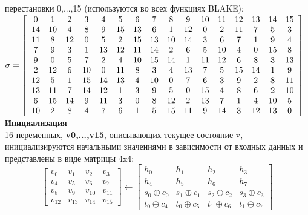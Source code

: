 \documentclass[12pt]{article}
\begin{document}
перестановки {0,...,15} (используются во всех функциях BLAKE):\\
$
\sigma = 
\left[
\begin{array}{*{16}c}
  0 &  1 &  2 &  3 &  4 &  5 &  6 &  7 &  8 &  9 & 10 & 11 & 12 & 13 & 14 & 15\\
 14 & 10 &  4 &  8 &  9 & 15 & 13 &  6 &  1 & 12 &  0 &  2 & 11 &  7 &  5 &  3\\
 11 &  8 & 12 &  0 &  5 &  2 & 15 & 13 & 10 & 14 &  3 &  6 &  7 &  1 &  9 &  4\\
  7 &  9 &  3 &  1 & 13 & 12 & 11 & 14 &  2 &  6 &  5 & 10 &  4 &  0 & 15 &  8\\
  9 &  0 &  5 &  7 &  2 &  4 & 10 & 15 & 14 &  1 & 11 & 12 &  6 &  8 &  3 & 13\\
  2 & 12 &  6 & 10 &  0 & 11 &  8 &  3 &  4 & 13 &  7 &  5 & 15 & 14 &  1 &  9\\
 12 &  5 &  1 & 15 & 14 & 13 &  4 & 10 &  0 &  7 &  6 &  3 &  9 &  2 &  8 & 11\\
 13 & 11 &  7 & 14 & 12 &  1 &  3 &  9 &  5 &  0 & 15 &  4 &  8 &  6 &  2 & 10\\
  6 & 15 & 14 &  9 & 11 &  3 &  0 &  8 & 12 &  2 & 13 &  7 &  1 &  4 & 10 & 5\\
 10 &  2 &  8 &  4 &  7 &  6 &  1 &  5 & 15 & 11 &  9 & 14 &  3 & 12 & 13 & 0
 
\end{array}
\right]
$
\\

\textbf{Инициализация}\\

16 переменных, \textbf{v0,...,v15}, описывающих текущее состояние v, инициализируются начальными значениями в зависимости от входных данных и представлены в виде матрицы 4x4:\\
\[
\begin{bmatrix}
    v_{0}	& v_{1}		& v_{2} 	& v_{3} \\
    v_{4}	& v_{5} 	& v_{6}		& v_{7} \\
    v_{8}	& v_{9} 	& v_{10} 	& v_{11} \\
    v_{12}	& v_{13} 	& v_{14} 	& v_{15}
\end{bmatrix}
\leftarrow
\begin{bmatrix}
    h_{0}			   & h_{1}				& h_{2} 	         & h_{3} \\
    h_{4}			   & h_{5} 			    & h_{6}		         & h_{7} \\
    s_{0} \oplus c_{0} & s_{1} \oplus c_{1} & s_{2} \oplus c_{2} & s_{3} \oplus c_{3} \\
    t_{0} \oplus c_{4} & t_{0} \oplus c_{5}	& t_{1} \oplus c_{6} & t_{1} \oplus c_{7}
\end{bmatrix}
\]
\\
\end{document}
